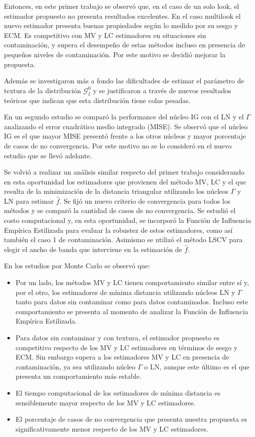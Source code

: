 Entonces, en este primer trabajo se observó que, en el caso de un solo look, el estimador propuesto no presenta resultados excelentes. En el caso multilook el nuevo estimador presenta buenas propiedades según lo medido
por su sesgo y ECM. Es competitivo con MV y LC estimadores en situaciones sin contaminación, y supera el desempeño de estas métodos incluso en presencia de pequeños niveles de contaminación. Por este motivo se decidió mejorar la propuesta. 

Además se investigaron más a fondo las dificultades de estimar el parámetro de textura de la distribución $\mathcal{G}_I^0$  y se justificaron a través de nuevos resultados teóricos que indican que esta distribución tiene colas pesadas.

En un segundo estudio se comparó la performance del núcleo IG con el LN y el $\Gamma$ analizando el error cuadrático medio integrado (MISE). Se observó que el núcleo IG es el que mayor MISE presentó frente a los otros núcleos y mayor porcentaje de casos de no convergencia. Por este motivo no se lo consideró en el nuevo estudio que se llevó adelante.

Se volvió a realizar un análisis similar respecto del primer trabajo considerando en esta oportunidad los estimadores que provienen del método MV, LC y el que resulta de la minimización de la distancia triangular utilizando los núcleos $\Gamma$ y LN para estimar $\widehat{f}$. Se fijó un nuevo criterio de convergencia para todos los métodos y se comparó la cantidad de casos de no convergencia. Se estudió el costo computacional y, en esta oportunidad, se incorporó la Función de Influencia Empírica Estilizada para evaluar la robustez de estos estimadores, como así también el caso 1 de contaminación. Asimismo se utilizó el método LSCV para elegir el ancho de banda que interviene en la estimación de $\widehat{f}$. 

En los estudios por Monte Carlo se observó que:

\begin{itemize}
	\item Por un lado, los métodos MV y LC tienen comportamiento similar entre sí y, por el otro, los estimadores de mínima distancia utilizando núcleos LN y $\Gamma$ tanto para datos sin contaminar como para datos contaminados. Incluso este comportamiento se presenta al momento de analizar la Función de Influencia Empírica Estilizada.
	\item Para datos sin contaminar y con textura, el estimador propuesto es competitivo respecto de los MV y LC estimadores en términos de sesgo y ECM. Sin embargo supera a los estimadores MV y LC en presencia de contaminación, ya sea utilizando núcleo $\Gamma$ o LN, aunque este último es el que presenta un comportamiento más estable.
	\item El tiempo computacional de los estimadores de mínima distancia es sensiblemente mayor respecto de los MV y LC estimadores.
	\item El porcentaje de casos de no convergencia que presenta nuestra propuesta es significativamente menor respecto de los MV y LC estimadores.
\end{itemize}

